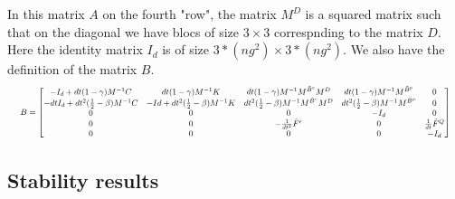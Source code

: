 In this matrix $A$ on the fourth "row", the matrix $M^D$ is a squared matrix such that   
on the diagonal we have blocs of size  $3 \times 3$ correspnding to the matrix $D$. Here the identity matrix $I_d$ is of size $3*(ng^2) \times 3*(ng^2)$.
We also have the definition of the matrix $B$.
\begin{equation}
\resizebox{\columnwidth}{!}{
$
B = \begin{bmatrix}
-I_d + dt (1-\gamma) M^{-1} C & dt (1-\gamma) M^{-1} K & dt (1-\gamma) M^{-1} M^{\tilde{B}^{e}}M^D & dt (1-\gamma) M^{-1} M^{\tilde{B}^{p}} & 0  \\

 - dt I_d + dt^2 (\frac{1}{2} - \beta) M^{-1} C & - Id + dt^2 (\frac{1}{2} - \beta) M^{-1}K & dt^2 (\frac{1}{2} - \beta) M^{-1}M^{\tilde{B}^{e}}M^D  & dt^2 (\frac{1}{2} - \beta) M^{-1} M^{\tilde{B}^{p}} & 0  \\

0 & 0 & 0 & -I_d & 0 \\
0 & 0 & -\frac{1}{dt^2}\hat{F}^\epsilon & 0 &  \frac{1}{dt} \hat{F}^Q \\
0 & 0 & 0 & 0 & -I_d 
\end{bmatrix}
$
}
\label{eq:B}
\end{equation}

\subsection{Stability results}
